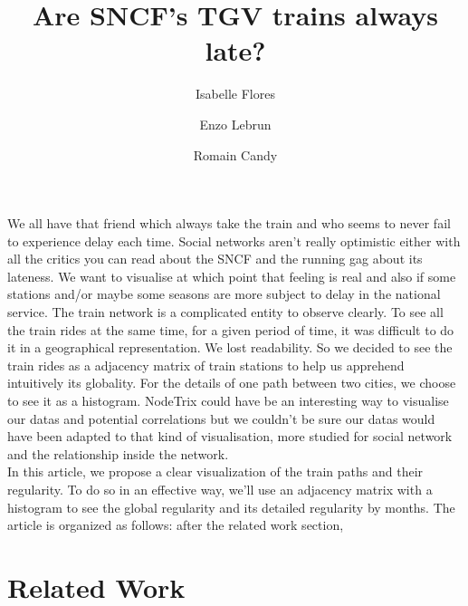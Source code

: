 \documentclass{vgtc}                          %
\title{Are SNCF's TGV trains always late?}
\author{Isabelle Flores
\and Enzo Lebrun
\and Romain Candy}
\begin{document}


\maketitle

We all have that friend which always take the train and who seems to never fail to experience delay each time. Social networks aren’t really optimistic either with all the critics you can read about the SNCF and the running gag about its lateness. We want to visualise at which point that feeling is real and also if some stations and/or maybe some seasons are more subject to delay in the national service. The train network is a complicated entity to observe clearly. To see all the train rides at the same time, for a given period of time, it was difficult to do it in a geographical representation. We lost readability. So we decided to see the train rides as a adjacency matrix of train stations to help us apprehend intuitively its globality. For the details of one path between two cities, we choose to see it as a histogram. NodeTrix could have be an interesting way to visualise our datas and potential correlations but we couldn’t be sure our datas would have been adapted to that kind of visualisation, more studied for social network and the relationship inside the network.
\\
\indent
In this article, we propose a clear visualization of the train paths and their regularity. To do so in an effective way, we’ll use an adjacency matrix with a histogram to see the global regularity and its detailed regularity by months.
The article is organized as follows: after the related work
section,


\section{Related Work}
\end{document}
